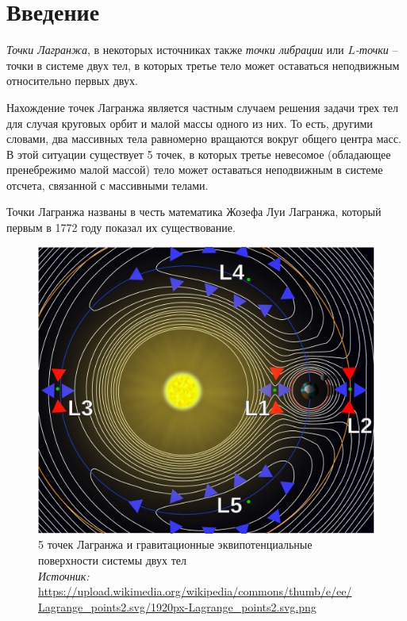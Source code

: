 \documentclass[12pt]{article}
\begin{document}
    \newpage

    \section{Введение}
    \par \textit{Точки Лагранжа}, в некоторых источниках также \textit{точки
    либрации} или \textit{$L$-точки} -- точки в системе двух тел, в которых
    третье тело может оставаться неподвижным относительно первых двух.
    \par Нахождение точек Лагранжа является частным случаем решения задачи
    трех тел для случая круговых орбит и малой массы одного из них. То есть,
    другими словами, два массивных тела равномерно вращаются вокруг общего
    центра масс. В этой ситуации существует 5 точек, в которых третье
    невесомое (обладающее пренебрежимо малой массой) тело может оставаться
    неподвижным в системе отсчета, связанной с массивными телами.
    \par Точки Лагранжа названы в честь математика Жозефа Луи Лагранжа,
    который первым в 1772 году показал их существование.
    \begin{figure}[H]
        \centering
        \includegraphics[scale=0.35]{Lagrange_points.pdf}
        \caption{5 точек Лагранжа и гравитационные эквипотенциальные
        поверхности системы двух тел\\
        \textit{Источник:}
        \url{https://upload.wikimedia.org/wikipedia/commons/thumb/e/ee/
        Lagrange_points2.svg/1920px-Lagrange_points2.svg.png}}
    \end{figure}
\end{document}
